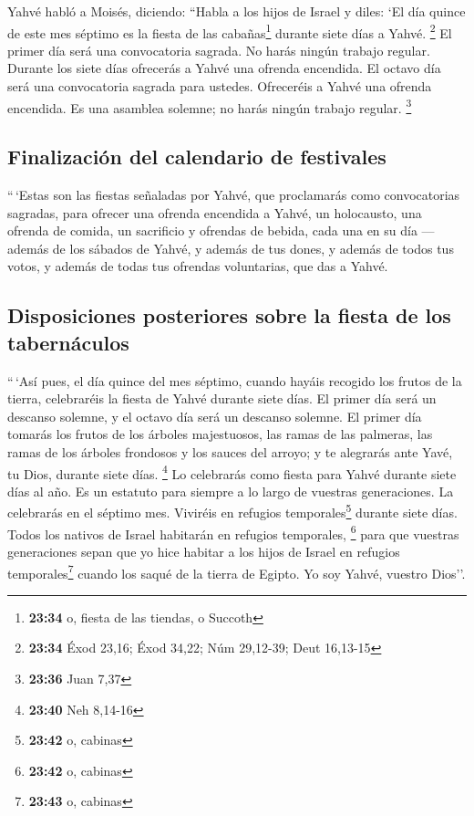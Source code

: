 \begin{paracol}{2}
 Yahvé habló a Moisés, diciendo:  ``Habla
a los hijos de Israel y diles: `El día quince de este mes séptimo es la
fiesta de las cabañas\footnote{\textbf{23:34} o, fiesta de las tiendas,
  o Succoth} durante siete días a Yahvé. \footnote{\textbf{23:34} Éxod
  23,16; Éxod 34,22; Núm 29,12-39; Deut 16,13-15}  El
primer día será una convocatoria sagrada. No harás ningún trabajo
regular.  Durante los siete días ofrecerás a Yahvé una
ofrenda encendida. El octavo día será una convocatoria sagrada para
ustedes. Ofreceréis a Yahvé una ofrenda encendida. Es una asamblea
solemne; no harás ningún trabajo regular. \footnote{\textbf{23:36} Juan
  7,37}

\hypertarget{finalizaciuxf3n-del-calendario-de-festivales}{%
\subsection{Finalización del calendario de
festivales}\label{finalizaciuxf3n-del-calendario-de-festivales}}

 ``\,`Estas son las fiestas señaladas por Yahvé, que
proclamarás como convocatorias sagradas, para ofrecer una ofrenda
encendida a Yahvé, un holocausto, una ofrenda de comida, un sacrificio y
ofrendas de bebida, cada una en su día ---  además de los
sábados de Yahvé, y además de tus dones, y además de todos tus votos, y
además de todas tus ofrendas voluntarias, que das a Yahvé.

\hypertarget{disposiciones-posteriores-sobre-la-fiesta-de-los-tabernuxe1culos}{%
\subsection{Disposiciones posteriores sobre la fiesta de los
tabernáculos}\label{disposiciones-posteriores-sobre-la-fiesta-de-los-tabernuxe1culos}}

 ``\,`Así pues, el día quince del mes séptimo, cuando
hayáis recogido los frutos de la tierra, celebraréis la fiesta de Yahvé
durante siete días. El primer día será un descanso solemne, y el octavo
día será un descanso solemne.  El primer día tomarás los
frutos de los árboles majestuosos, las ramas de las palmeras, las ramas
de los árboles frondosos y los sauces del arroyo; y te alegrarás ante
Yavé, tu Dios, durante siete días. \footnote{\textbf{23:40} Neh 8,14-16}
 Lo celebrarás como fiesta para Yahvé durante siete días
al año. Es un estatuto para siempre a lo largo de vuestras generaciones.
La celebrarás en el séptimo mes.  Viviréis en refugios
temporales\footnote{\textbf{23:42} o, cabinas} durante siete días. Todos
los nativos de Israel habitarán en refugios temporales, \footnote{\textbf{23:42}
  o, cabinas}  para que vuestras generaciones sepan que
yo hice habitar a los hijos de Israel en refugios temporales\footnote{\textbf{23:43}
  o, cabinas} cuando los saqué de la tierra de Egipto. Yo soy Yahvé,
vuestro Dios''.


\end{paracol}
